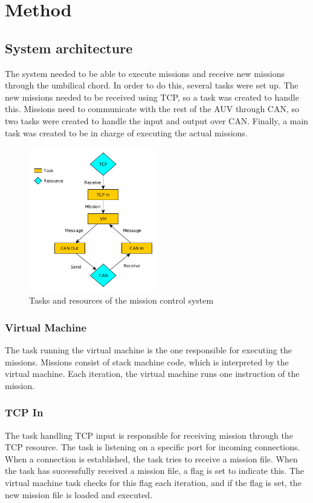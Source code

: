 \section{Method}\label{sec:method}
\subsection{System architecture}
The system needed to be able to execute missions and receive new missions through the umbilical chord. In order to do this, several tasks were set up. The new missions needed to be received using TCP, so a task was created to handle this. Missions need to communicate with the rest of the AUV through CAN, so two tasks were created to handle the input and output over CAN. Finally, a main task was created to be in charge of executing the actual missions.

\pageref{fig:data_flow_figure}
\begin{figure}[h]
    \includegraphics[width=0.5\textwidth]{./figure/figureTasksAndResources.png}
    \caption{Tasks and resources of the mission control system}
    \label{fig:data_flow_figure}
\end{figure}

\subsubsection{Virtual Machine}
The task running the virtual machine is the one responsible for executing the missions. Missions consist of stack machine code, which is interpreted by the virtual machine. Each iteration, the virtual machine runs one instruction of the mission.

\subsubsection{TCP In}
The task handling TCP input is responsible for receiving mission through the TCP resource. The task is listening on a specific port for incoming connections. When a connection is established, the task tries to receive a mission file. When the task has successfully received a mission file, a flag is set to indicate this. The virtual machine task checks for this flag each iteration, and if the flag is set, the new mission file is loaded and executed.

